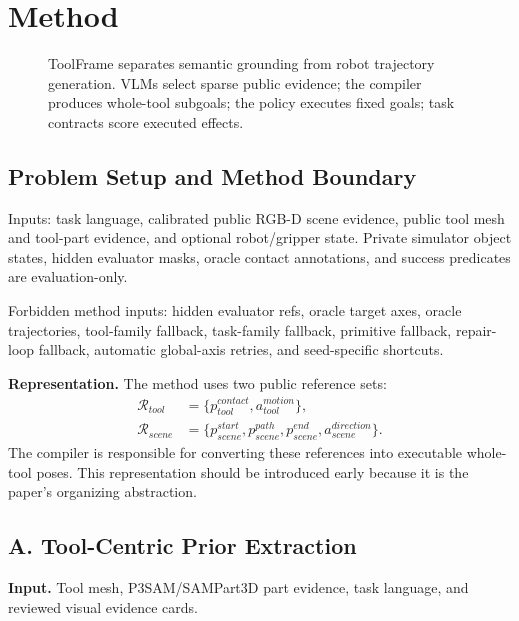 \documentclass[journal]{IEEEtran}
\newcommand{\method}{ToolFrame}
\begin{document}
\section{Method}
\begin{figure}[t]
\centering
{}
\caption{\method{} separates semantic grounding from robot trajectory
generation. VLMs select sparse public evidence; the compiler produces
whole-tool subgoals; the policy executes fixed goals; task contracts score
executed effects.}
\label{fig:pipeline}
\end{figure}

\subsection{Problem Setup and Method Boundary}
Inputs: task language, calibrated public RGB-D scene evidence, public tool mesh
and tool-part evidence, and optional robot/gripper state. Private simulator
object states, hidden evaluator masks, oracle contact annotations, and success
predicates are evaluation-only.

Forbidden method inputs: hidden evaluator refs, oracle target axes, oracle
trajectories, tool-family fallback, task-family fallback, primitive fallback,
repair-loop fallback, automatic global-axis retries, and seed-specific
shortcuts.

\textbf{Representation.} The method uses two public reference sets:
\begin{align}
\mathcal{R}_{tool} &= \{p^{contact}_{tool}, a^{motion}_{tool}\}, \\
\mathcal{R}_{scene} &= \{p^{start}_{scene}, p^{path}_{scene}, p^{end}_{scene},
a^{direction}_{scene}\}.
\end{align}
The compiler is responsible for converting these references into executable
whole-tool poses. This representation should be introduced early because it is
the paper's organizing abstraction.

\subsection{A. Tool-Centric Prior Extraction}
\textbf{Input.} Tool mesh, P3SAM/SAMPart3D part evidence, task language, and
reviewed visual evidence cards.
\end{document}
